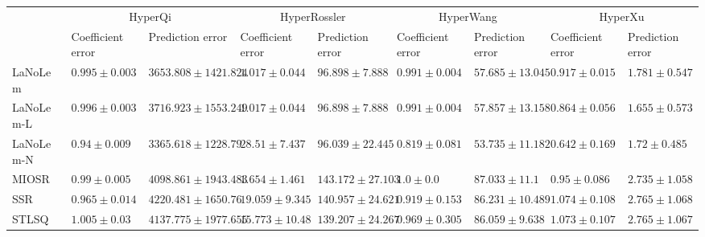 \begin{table*}
{\begin{tabular}{lllllllll}
 & \multicolumn{2}{c}{HyperQi} & \multicolumn{2}{c}{HyperRossler} & \multicolumn{2}{c}{HyperWang} & \multicolumn{2}{c}{HyperXu} \\
 & Coefficient error & Prediction error & Coefficient error & Prediction error & Coefficient error & Prediction error & Coefficient error & Prediction error \\
\midrule
LaNoLem & $0.995\pm 0.003$ & $3653.808\pm 1421.824$ & $\mathbf{1.017}\pm 0.044$ & $96.898\pm 7.888$ & $0.991\pm 0.004$ & $57.685\pm 13.045$ & $0.917\pm 0.015$ & $1.781\pm 0.547$ \\
LaNoLem-L & $0.996\pm 0.003$ & $3716.923\pm 1553.249$ & $\mathbf{1.017}\pm 0.044$ & $96.898\pm 7.888$ & $0.991\pm 0.004$ & $57.857\pm 13.158$ & $0.864\pm 0.056$ & $\mathbf{1.655}\pm 0.573$ \\
LaNoLem-N & $\mathbf{0.94}\pm 0.009$ & $\mathbf{3365.618}\pm 1228.79$ & $28.51\pm 7.437$ & $\mathbf{96.039}\pm 22.445$ & $\mathbf{0.819}\pm 0.081$ & $\mathbf{53.735}\pm 11.182$ & $\mathbf{0.642}\pm 0.169$ & $1.72\pm 0.485$ \\
MIOSR & $0.99\pm 0.005$ & $4098.861\pm 1943.483$ & $1.654\pm 1.461$ & $143.172\pm 27.103$ & $1.0\pm 0.0$ & $87.033\pm 11.1$ & $0.95\pm 0.086$ & $2.735\pm 1.058$ \\
SSR & $0.965\pm 0.014$ & $4220.481\pm 1650.76$ & $19.059\pm 9.345$ & $140.957\pm 24.621$ & $0.919\pm 0.153$ & $86.231\pm 10.489$ & $1.074\pm 0.108$ & $2.765\pm 1.068$ \\
STLSQ & $1.005\pm 0.03$ & $4137.775\pm 1977.655$ & $15.773\pm 10.48$ & $139.207\pm 24.267$ & $0.969\pm 0.305$ & $86.059\pm 9.638$ & $1.073\pm 0.107$ & $2.765\pm 1.067$ \\

\midrule


\end{tabular}}
\end{table*}

